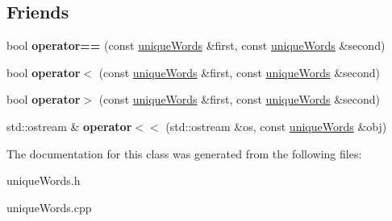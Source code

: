 \subsection*{Friends}
\begin{DoxyCompactItemize}
\item 
\hypertarget{classunique_words_af3ed50cf61bd932ffc5e2bfe7e29c0ba}{bool {\bfseries operator==} (const \hyperlink{classunique_words}{unique\+Words} \&first, const \hyperlink{classunique_words}{unique\+Words} \&second)}\label{classunique_words_af3ed50cf61bd932ffc5e2bfe7e29c0ba}

\item 
\hypertarget{classunique_words_a0ea90430d23ca61da90502d8005ee1f4}{bool {\bfseries operator$<$} (const \hyperlink{classunique_words}{unique\+Words} \&first, const \hyperlink{classunique_words}{unique\+Words} \&second)}\label{classunique_words_a0ea90430d23ca61da90502d8005ee1f4}

\item 
\hypertarget{classunique_words_a6e99568e63a3985ccaa4222798d643c7}{bool {\bfseries operator$>$} (const \hyperlink{classunique_words}{unique\+Words} \&first, const \hyperlink{classunique_words}{unique\+Words} \&second)}\label{classunique_words_a6e99568e63a3985ccaa4222798d643c7}

\item 
\hypertarget{classunique_words_ad6afc81cc3346922a1f84d5e2b134325}{std\+::ostream \& {\bfseries operator$<$$<$} (std\+::ostream \&os, const \hyperlink{classunique_words}{unique\+Words} \&obj)}\label{classunique_words_ad6afc81cc3346922a1f84d5e2b134325}

\end{DoxyCompactItemize}


The documentation for this class was generated from the following files\+:\begin{DoxyCompactItemize}
\item 
unique\+Words.\+h\item 
unique\+Words.\+cpp\end{DoxyCompactItemize}
